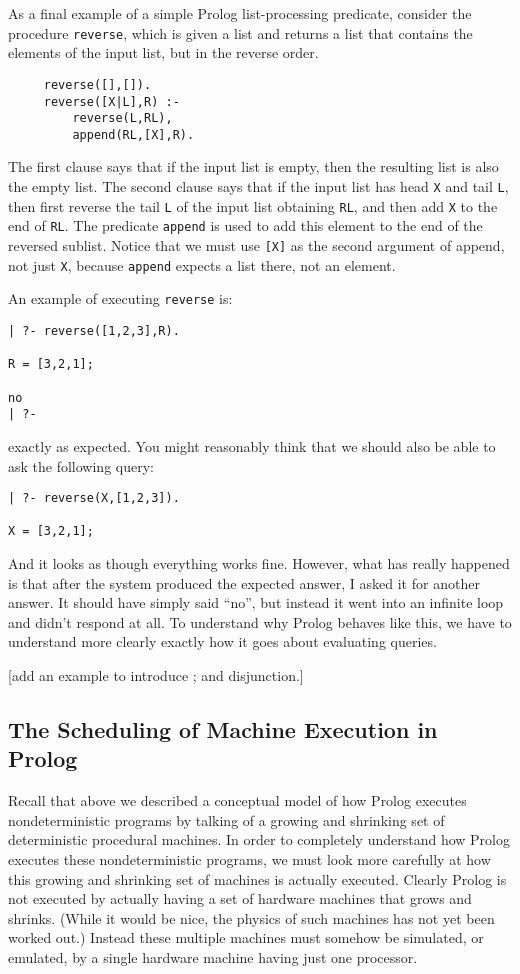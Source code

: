 As a final example of a simple Prolog list-processing predicate,
consider the procedure \verb|reverse|, which is given a list and
returns a list that contains the elements of the input list, but in
the reverse order.
\begin{verbatim}
     reverse([],[]).
     reverse([X|L],R) :-
         reverse(L,RL),
         append(RL,[X],R).
\end{verbatim}
The first clause says that if the input list is empty, then the
resulting list is also the empty list.  The second clause says that if
the input list has head \verb|X| and tail \verb|L|, then first reverse
the tail \verb|L| of the input list obtaining \verb|RL|, and then add
\verb|X| to the end of \verb|RL|.  The predicate \verb|append| is used
to add this element to the end of the reversed sublist.  Notice that
we must use \verb|[X]| as the second argument of append, not just
\verb|X|, because \verb|append| expects a list there, not an element.

An example of executing \verb|reverse| is:
\begin{verbatim}
| ?- reverse([1,2,3],R).

R = [3,2,1];

no
| ?- 
\end{verbatim}
exactly as expected.  You might reasonably think that we should also
be able to ask the following query:
\begin{verbatim}
| ?- reverse(X,[1,2,3]).

X = [3,2,1];
\end{verbatim}
And it looks as though everything works fine.  However, what has
really happened is that after the system produced the expected answer,
I asked it for another answer.  It should have simply said ``no'', but
instead it went into an infinite loop and didn't respond at all.  To
understand why Prolog behaves like this, we have to understand more
clearly exactly how it goes about evaluating queries.

[add an example to introduce ; and disjunction.]

\subsection{The Scheduling of Machine Execution in Prolog}

Recall that above we described a conceptual model of how Prolog
executes nondeterministic programs by talking of a growing and
shrinking set of deterministic procedural machines.  In order to
completely understand how Prolog executes these nondeterministic
programs, we must look more carefully at how this growing and
shrinking set of machines is actually executed.  Clearly Prolog is not
executed by actually having a set of hardware machines that grows and
shrinks.  (While it would be nice, the physics of such machines has
not yet been worked out.)  Instead these multiple machines must
somehow be simulated, or emulated, by a single hardware machine having
just one processor.

